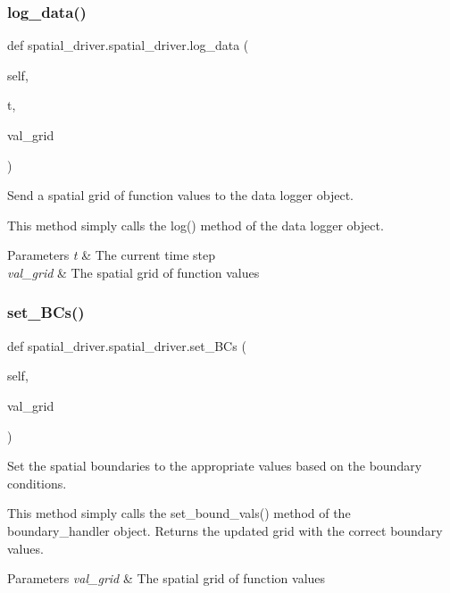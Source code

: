 \subsubsection{\texorpdfstring{log\+\_\+data()}{log\_data()}}
{\footnotesize\ttfamily def spatial\+\_\+driver.\+spatial\+\_\+driver.\+log\+\_\+data (\begin{DoxyParamCaption}\item[{}]{self,  }\item[{}]{t,  }\item[{}]{val\+\_\+grid }\end{DoxyParamCaption})}



Send a spatial grid of function values to the data logger object. 

This method simply calls the log() method of the data logger object. 
\begin{DoxyParams}{Parameters}
{\em t} & The current time step \\
\hline
{\em val\+\_\+grid} & The spatial grid of function values \\
\hline
\end{DoxyParams}
\mbox{\label{classspatial__driver_1_1spatial__driver_a9e108d8aae84dbbfdbd522ef47e8f559}} 
\subsubsection{\texorpdfstring{set\+\_\+\+B\+Cs()}{set\_BCs()}}
{\footnotesize\ttfamily def spatial\+\_\+driver.\+spatial\+\_\+driver.\+set\+\_\+\+B\+Cs (\begin{DoxyParamCaption}\item[{}]{self,  }\item[{}]{val\+\_\+grid }\end{DoxyParamCaption})}



Set the spatial boundaries to the appropriate values based on the boundary conditions. 

This method simply calls the set\+\_\+bound\+\_\+vals() method of the boundary\+\_\+handler object. Returns the updated grid with the correct boundary values. 
\begin{DoxyParams}{Parameters}
{\em val\+\_\+grid} & The spatial grid of function values \\
\hline
\end{DoxyParams}
\mbox{\label{classspatial__driver_1_1spatial__driver_a379238cfd02adf2ae124015e1108182d}} 
